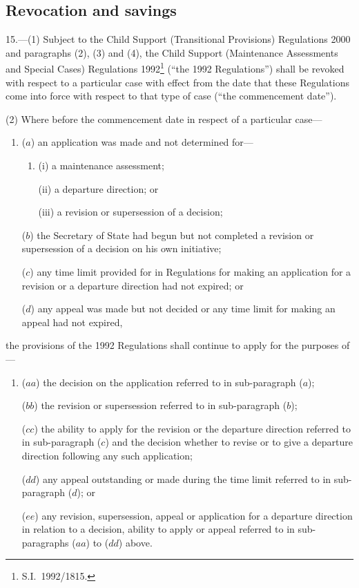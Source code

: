 \documentclass[12pt,a4paper]{article}
\begin{document}
\subsection[15. Revocation and savings]{Revocation and savings}

15.---(1)  Subject to 
the Child Support (Transitional Provisions) Regulations 2000 and %
paragraphs (2), (3) and (4), the Child Support (Maintenance Assessments and Special Cases) Regulations 1992\footnote{S.I.\ 1992/1815.} (“the 1992 Regulations”) shall be revoked with respect to a particular case with effect from the date that these Regulations come into force with respect to that type of case (“the commencement date”).

(2) Where before the commencement date in respect of a particular case—
\begin{enumerate}\item[]
($a$) an application was made and not determined for—
\begin{enumerate}\item[]
(i) a maintenance assessment;

(ii) a departure direction; or

(iii) a revision or supersession of a decision;
\end{enumerate}

($b$) the Secretary of State had begun but not completed a revision or supersession of a decision on his own initiative;

($c$) any time limit provided for in Regulations for making an application for a revision or a departure direction had not expired; or

($d$) any appeal was made but not decided or any time limit for making an appeal had not expired,
\end{enumerate}
the provisions of the 1992 Regulations shall continue to apply for the purposes of—
\begin{enumerate}\item[]
($aa$) the decision on the application referred to in sub-paragraph ($a$);

($bb$) the revision or supersession referred to in sub-paragraph ($b$);

($cc$) the ability to apply for the revision or the departure direction referred to in sub-paragraph ($c$)  and the decision whether to revise or to give a departure direction following any such application;

($dd$) any appeal outstanding or made during the time limit referred to in sub-paragraph ($d$); or

($ee$) any revision, supersession, appeal or application for a departure direction in relation to a decision, ability to apply or appeal referred to in sub-paragraphs ($aa$)  to ($dd$) above.
\end{enumerate}
\end{document}
